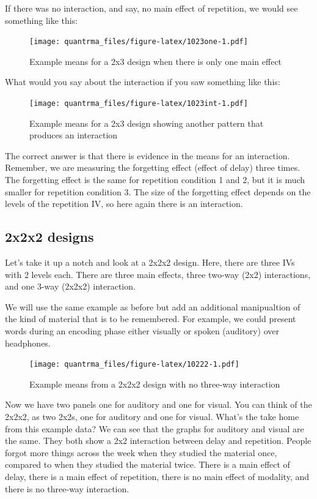 \documentclass[
]{book}
\begin{document}
If there was no interaction, and say, no main effect of repetition, we would see something like this:

\begin{figure}
\centering
\texttt{[image: quantrma\_files/figure-latex/1023one-1.pdf]}
\caption{\label{fig:1023one}Example means for a 2x3 design when there is only one main effect}
\end{figure}

What would you say about the interaction if you saw something like this:

\begin{figure}
\centering
\texttt{[image: quantrma\_files/figure-latex/1023int-1.pdf]}
\caption{\label{fig:1023int}Example means for a 2x3 design showing another pattern that produces an interaction}
\end{figure}

The correct answer is that there is evidence in the means for an interaction. Remember, we are measuring the forgetting effect (effect of delay) three times. The forgetting effect is the same for repetition condition 1 and 2, but it is much smaller for repetition condition 3. The size of the forgetting effect depends on the levels of the repetition IV, so here again there is an interaction.

\hypertarget{x2x2-designs}{%
\subsection{2x2x2 designs}\label{x2x2-designs}}

Let's take it up a notch and look at a 2x2x2 design. Here, there are three IVs with 2 levels each. There are three main effects, three two-way (2x2) interactions, and one 3-way (2x2x2) interaction.

We will use the same example as before but add an additional manipualtion of the kind of material that is to be remembered. For example, we could present words during an encoding phase either visually or spoken (auditory) over headphones.

\begin{figure}
\centering
\texttt{[image: quantrma\_files/figure-latex/10222-1.pdf]}
\caption{\label{fig:10222}Example means from a 2x2x2 design with no three-way interaction}
\end{figure}

Now we have two panels one for auditory and one for visual. You can think of the 2x2x2, as two 2x2s, one for auditory and one for visual. What's the take home from this example data? We can see that the graphs for auditory and visual are the same. They both show a 2x2 interaction between delay and repetition. People forgot more things across the week when they studied the material once, compared to when they studied the material twice. There is a main effect of delay, there is a main effect of repetition, there is no main effect of modality, and there is no three-way interaction.
\end{document}
